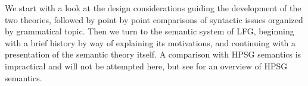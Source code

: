  

 We start with a look at the design considerations guiding the development of the two theories, followed by point by point comparisons of syntactic issues organized by grammatical topic.  Then we turn to the semantic system of LFG, beginning with a brief history by way of explaining its motivations, and continuing with a presentation of the semantic theory itself.  A comparison with HPSG semantics is impractical and will not be attempted here, but see   for an overview of HPSG semantics.  

